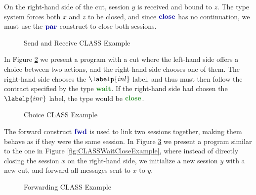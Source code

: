 On the right-hand side of the cut, session $y$ is received and bound to $z$. The type system forces both $x$ and $z$ to be closed, and since $\closep$ has no continuation, we must use the $\parp$ construct to close both sessions.

\begin{figure}[H]
    \centering
    \begin{class}
    \end{class}
    \caption{Send and Receive CLASS Example}
    \label{fig:CLASSSendAndReceiveExample}
\end{figure}

In Figure \ref{fig:CLASSChoiceExample} we present a program with a cut where the left-hand side offers a choice between two actions, and the right-hand side chooses one of them. The right-hand side chooses the $\labelp{inl}$ label, and thus must then follow the contract specified by the type $\waitt$. If the right-hand side had chosen the $\labelp{inr}$ label, the type would be $\closet$.

\begin{figure}[H]
    \centering
    \begin{class}
    \end{class}
    \caption{Choice CLASS Example}
    \label{fig:CLASSChoiceExample}
\end{figure}

The forward construct $\fwdp$ is used to link two sessions together, making them behave as if they were the same session. In Figure \ref{fig:CLASSForwardExample} we present a program similar to the one in Figure \ref{fig:CLASSWaitCloseExample}, where instead of directly closing the session $x$ on the right-hand side, we initialize a new session $y$ with a new cut, and forward all messages sent to $x$ to $y$.

\begin{figure}[H]
    \centering
    \begin{class}
    \end{class}
    \caption{Forwarding CLASS Example}
    \label{fig:CLASSForwardExample}
\end{figure}

